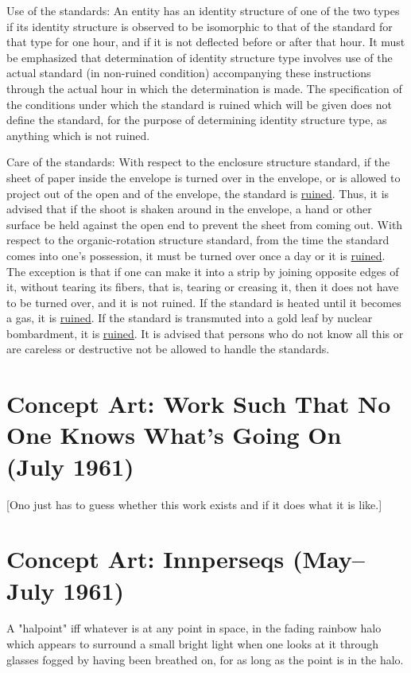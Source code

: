 Use of the standards: An entity has an identity structure
of one of the two types if its identity structure is observed 
to be isomorphic to that of the standard for that type for one
hour, and if it is not deflected before or after that hour. 
It must be emphasized that determination of identity structure
type involves use of the actual standard (in non-ruined condition)
accompanying these instructions through the actual hour
in which the determination is made. The specification of the
conditions under which the standard is ruined which will be 
given does not define the standard, for the purpose of determining
identity structure type, as anything which is not ruined. 

Care of the standards: With respect to the enclosure 
structure standard, if the sheet of paper inside the envelope
is turned over in the envelope, or is allowed to project out
of the open and of the envelope, the standard is \uline{ruined}. Thus, 
it is advised that if the shoot is shaken around in the envelope,
a hand or other surface be held against the open end to prevent
the sheet from coming out. With respect to the organic-rotation 
structure standard, from the time the standard comes into one's
possession, it must be turned over once a day or it is \uline{ruined}.
The exception is that if one can make it into a strip by
joining opposite edges of it, without tearing its fibers, that
is, tearing or creasing it, then it does not have to be turned
over, and it is not ruined. If the standard is heated until it
becomes a gas, it is \uline{ruined}. If the standard is transmuted into 
a gold leaf by nuclear bombardment, it is \uline{ruined}. It is advised
that persons who do not know all this or are careless or destructive
not be allowed to handle the standards.

\clearpage
\section{Concept Art: Work Such That No One Knows What's Going On (July 1961)}

[Ono just has to guess whether this work exists and if it does what it is like.]

\clearpage
\section{Concept Art: Innperseqs (May--July 1961)}

A "halpoint" iff whatever is at any point in space, in the fading rainbow halo which appears to surround a small bright light when one looks at it through glasses fogged by having been breathed on, for as long as the point is in the halo. 

